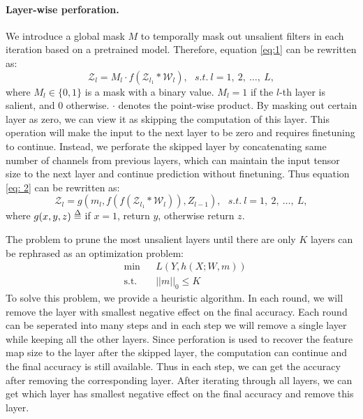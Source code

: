 \documentclass[pageno]{jpaper}
\def\delequal{\mathrel{\ensurestackMath{\stackon[1pt]{=}{\scriptstyle\Delta}}}}
\begin{document}
\paragraph{Layer-wise perforation.}
We introduce a global mask $M$ to temporally mask out unsalient filters in each iteration based on a pretrained model. Therefore, equation \ref{eq:1} can be rewritten as:
\begin{equation} \label{eq: 2}
    \mathcal{Z}_l = M_l \cdot f(\mathcal{Z}_{l_1} \ast \mathcal{W}_l), \ \ \  s.t. \: l = 1,\: 2, \: \dots, \: L,
\end{equation}
where $M_l \in \{0, 1\}$ is a mask with a binary value. $M_l = 1$ if the $l$-th layer is salient, and $0$ otherwise. $\cdot$ denotes the point-wise product. By masking out certain layer as zero, we can view it as skipping the computation of this layer. This operation will make the input to the next layer to be zero and requires finetuning to continue. Instead, we perforate the skipped layer by concatenating same number of channels from previous layers, which can maintain the input tensor size to the next layer and continue prediction without finetuning. Thus equation \ref{eq: 2} can be rewritten as:
\begin{equation}
    \mathcal{Z}_l = g(m_l, f(f(\mathcal{Z}_{l_1} \ast \mathcal{W}_l)), Z_{l-1}), \ \ \  s.t. \: l = 1,\: 2, \: \dots, \: L,
\end{equation}
where $g(x,y,z)  \delequal \; $if $x = 1$, return $y$, otherwise return $z$.

The problem to prune the most unsalient layers until there are only $K$ layers can be rephrased as an optimization problem:
\begin{equation*}
\begin{aligned}
& {\text{min}}
& & L(Y, h(X; W, m)) \\
& \text{s.t.}
& & ||m||_0 \leq K
\end{aligned}
\end{equation*}
To solve this problem, we provide a heuristic algorithm. In each round, we will remove the layer with smallest negative effect on the final accuracy. Each round can be seperated into many steps and in each step we will remove a single layer while keeping all the other layers. Since perforation is used to recover the feature map size to the layer after the skipped layer, the computation can continue and the final accuracy is still available. Thus in each step, we can get the accuracy after removing the corresponding layer. After iterating through all layers, we can get which layer has smallest negative effect on the final accuracy and remove this layer.
\end{document}
